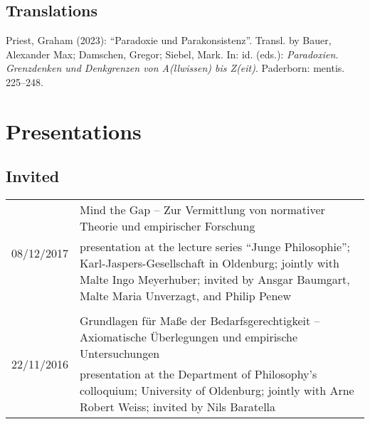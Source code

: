 \documentclass[a4paper,10pt]{article}
\newenvironment{literature}{%
   \parskip6pt\parindent0pt\raggedright
   \def\lititem{\hangindent=1cm\hangafter1}}{%
   \par\ignorespaces}
\begin{document}
\subsection*{Translations}
\begin{literature}
\lititem Priest, Graham (2023): \enquote{Paradoxie und Parakonsistenz}. Transl. by Bauer, Alexander Max; Damschen, Gregor; Siebel, Mark. In: id. (eds.): \textit{Paradoxien. Grenzdenken und Denkgrenzen von A(llwissen) bis Z(eit)}. Paderborn: mentis. 225--248.
\end{literature}


\clearpage
\section{Presentations}
\subsection*{Invited}
\begin{longtable}{p{}p{11cm}}
\multirow{2}{2,25cm}{\footnotesize{08/12/2017}} & Mind the Gap -- Zur Vermittlung von normativer Theorie und empirischer Forschung\\
& \footnotesize{presentation at the lecture series \enquote{Junge Philosophie}; Karl-Jaspers-Gesellschaft in Oldenburg; jointly with Malte Ingo Meyerhuber; invited by Ansgar Baumgart, Malte Maria Unverzagt, and Philip Penew}\\
\\
\multirow{2}{2,25cm}{\footnotesize{22/11/2016}} & Grundlagen für Maße der Bedarfsgerechtigkeit -- Axiomatische Überlegungen und empirische Untersuchungen\\
& \footnotesize{presentation at the Department of Philosophy's colloquium; University of Oldenburg; jointly with Arne Robert Weiss; invited by Nils Baratella}\\
\end{longtable}
\end{document}
